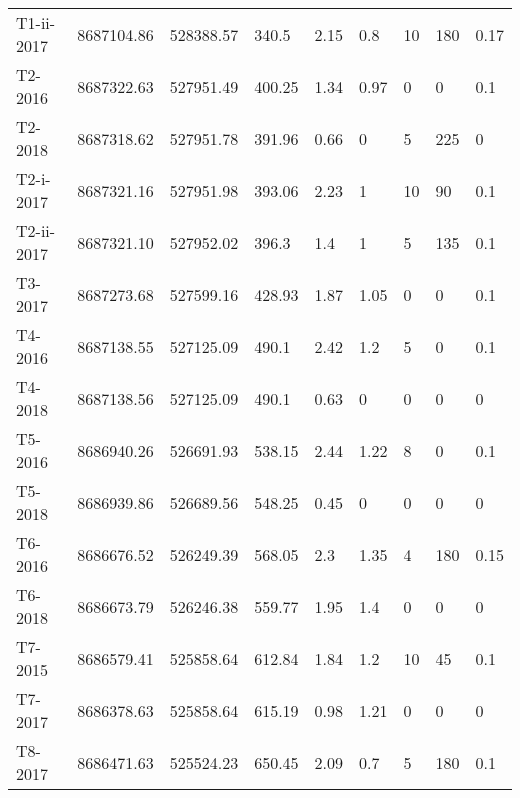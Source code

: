 \begin{tabular}{lllllllll}
  T1-ii-2017 &   8687104.86 &   528388.57 &         340.5 &               2.15 &            0.8 &                10 &                      180 &                     0.17 \\
     T2-2016 &   8687322.63 &   527951.49 &        400.25 &               1.34 &           0.97 &                 0 &                        0 &                      0.1 \\
     T2-2018 &   8687318.62 &   527951.78 &        391.96 &               0.66 &              0 &                 5 &                      225 &                        0 \\
   T2-i-2017 &   8687321.16 &   527951.98 &        393.06 &               2.23 &              1 &                10 &                       90 &                      0.1 \\
  T2-ii-2017 &   8687321.10 &   527952.02 &         396.3 &                1.4 &              1 &                 5 &                      135 &                      0.1 \\
     T3-2017 &   8687273.68 &   527599.16 &        428.93 &               1.87 &           1.05 &                 0 &                        0 &                      0.1 \\
     T4-2016 &   8687138.55 &   527125.09 &         490.1 &               2.42 &            1.2 &                 5 &                        0 &                      0.1 \\
     T4-2018 &   8687138.56 &   527125.09 &         490.1 &               0.63 &              0 &                 0 &                        0 &                        0 \\
     T5-2016 &   8686940.26 &   526691.93 &        538.15 &               2.44 &           1.22 &                 8 &                        0 &                      0.1 \\
     T5-2018 &   8686939.86 &   526689.56 &        548.25 &               0.45 &              0 &                 0 &                        0 &                        0 \\
     T6-2016 &   8686676.52 &   526249.39 &        568.05 &                2.3 &           1.35 &                 4 &                      180 &                     0.15 \\
     T6-2018 &   8686673.79 &   526246.38 &        559.77 &               1.95 &            1.4 &                 0 &                        0 &                        0 \\
     T7-2015 &   8686579.41 &   525858.64 &        612.84 &               1.84 &            1.2 &                10 &                       45 &                      0.1 \\
     T7-2017 &   8686378.63 &   525858.64 &        615.19 &               0.98 &           1.21 &                 0 &                        0 &                        0 \\
     T8-2017 &   8686471.63 &   525524.23 &        650.45 &               2.09 &            0.7 &                 5 &                      180 &                      0.1 \\
\bottomrule
\end{tabular}
